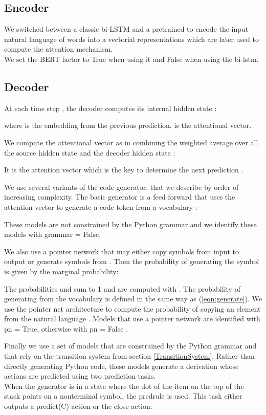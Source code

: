 \documentclass[11pt]{article}
\newcommand{\var}{\sc}
\begin{document}
\subsection{Encoder}
\label{subsec:encoder}
We switched between a classic bi-LSTM and a pretrained  to encode the input natural language  of  words into a vectorial representations  which are later used to compute the attention mechanism. \\
We set the {\var BERT} factor to {\var True} when using it and {\var False} when using the bi-{\sc lstm}.


\subsection{Decoder}
\label{subsec:decoder}

At each time step , the  decoder computes its internal hidden state : 


where  is the embedding from the previous prediction,  is the attentional vector. 

We compute the attentional vector  as in \citet{Attention} combining the weighted average over all the source hidden state  and the decoder hidden state : 

It is the attention vector  which is the key to determine the next prediction .



We use several variants of the code generator, that we describe by order of increasing complexity. The  basic generator is a feed forward that uses the attention vector to generate a code token  from a vocabulary :

These models are not constrained by the Python grammar and we identify these models with {\var grammar = False}. 

We also use a pointer network that may either copy symbols from input to output or generate symbols from . Then the probability of generating the symbol  is given by the marginal probability:
 
The probabilities  and  sum to 1 and are computed with . The probability of generating  from the vocabulary   is defined in the same way as (\ref{eqn:generate}). We use the pointer net architecture \cite{Pointernet} to compute the probability  of copying an element from the natural language . Models that use a pointer network are identified with {\var pn = True}, otherwise with {\var pn = False} . 

Finally we use a set of models that are constrained by the Python grammar and that rely on the transition system from section \ref{TransitionSystem}. Rather than directly generating Python code, these models generate a derivation whose actions are predicted using two prediction tasks. \\ 
When the generator is in a state where the dot of the item on the top of the stack points on a nonterminal symbol, the {\sc predrule} is used. This task either outputs a {\sc predict}(C) action or the {\sc close} action:
\end{document}
